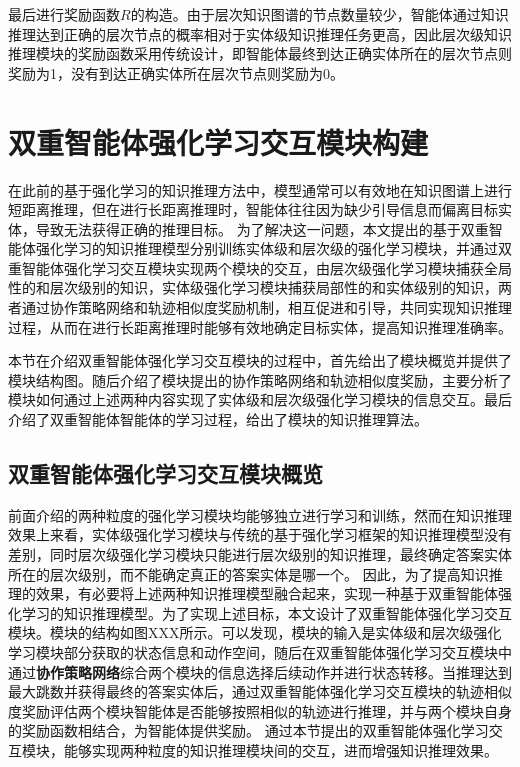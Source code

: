 \documentclass[algorithmlist, AutoFakeBold, AutoFakeSlant, figurelist, tablelist, nomlist, masters]{seuthesix}
\begin{document}
最后进行奖励函数$R$的构造。由于层次知识图谱的节点数量较少，智能体通过知识推理达到正确的层次节点的概率相对于实体级知识推理任务更高，因此层次级知识推理模块的奖励函数采用传统设计，即智能体最终到达正确实体所在的层次节点则奖励为1，没有到达正确实体所在层次节点则奖励为0。

\section{双重智能体强化学习交互模块构建}
在此前的基于强化学习的知识推理方法中，模型通常可以有效地在知识图谱上进行短距离推理，但在进行长距离推理时，智能体往往因为缺少引导信息而偏离目标实体，导致无法获得正确的推理目标。
为了解决这一问题，本文提出的基于双重智能体强化学习的知识推理模型分别训练实体级和层次级的强化学习模块，并通过双重智能体强化学习交互模块实现两个模块的交互，由层次级强化学习模块捕获全局性的和层次级别的知识，实体级强化学习模块捕获局部性的和实体级别的知识，两者通过协作策略网络和轨迹相似度奖励机制，相互促进和引导，共同实现知识推理过程，从而在进行长距离推理时能够有效地确定目标实体，提高知识推理准确率。

本节在介绍双重智能体强化学习交互模块的过程中，首先给出了模块概览并提供了模块结构图。随后介绍了模块提出的协作策略网络和轨迹相似度奖励，主要分析了模块如何通过上述两种内容实现了实体级和层次级强化学习模块的信息交互。最后介绍了双重智能体智能体的学习过程，给出了模块的知识推理算法。


\subsection{双重智能体强化学习交互模块概览}
前面介绍的两种粒度的强化学习模块均能够独立进行学习和训练，然而在知识推理效果上来看，实体级强化学习模块与传统的基于强化学习框架的知识推理模型没有差别，同时层次级强化学习模块只能进行层次级别的知识推理，最终确定答案实体所在的层次级别，而不能确定真正的答案实体是哪一个。
因此，为了提高知识推理的效果，有必要将上述两种知识推理模型融合起来，实现一种基于双重智能体强化学习的知识推理模型。为了实现上述目标，本文设计了双重智能体强化学习交互模块。模块的结构如图XXX所示。可以发现，模块的输入是实体级和层次级强化学习模块部分获取的状态信息和动作空间，随后在双重智能体强化学习交互模块中通过\textbf{协作策略网络}综合两个模块的信息选择后续动作并进行状态转移。当推理达到最大跳数并获得最终的答案实体后，通过双重智能体强化学习交互模块的轨迹相似度奖励评估两个模块智能体是否能够按照相似的轨迹进行推理，并与两个模块自身的奖励函数相结合，为智能体提供奖励。
通过本节提出的双重智能体强化学习交互模块，能够实现两种粒度的知识推理模块间的交互，进而增强知识推理效果。
\end{document}
